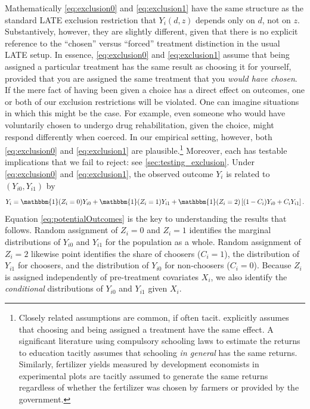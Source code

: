 \documentclass[12pt, a4paper]{article}
\begin{document}
Mathematically \eqref{eq:exclusion0} and \eqref{eq:exclusion1} have the same structure as the standard LATE exclusion restriction that $Y_i(d,z)$ depends only on $d$, not on $z$. 
Substantively, however, they are slightly different, given that there is no explicit reference to the ``chosen'' versus ``forced'' treatment distinction in the usual LATE setup.
In essence, \eqref{eq:exclusion0} and \eqref{eq:exclusion1} assume that being assigned a particular treatment has the same result as choosing it for yourself, provided that you are assigned the same treatment that you \emph{would have chosen}. 
If the mere fact of having been given a choice has a direct effect on outcomes, one or both of our exclusion restrictions will be violated.
One can imagine situations in which this might be the case.
For example, even someone who would have voluntarily chosen to undergo drug rehabilitation, given the choice, might respond differently when coerced.
In our empirical setting, however, both \eqref{eq:exclusion0} and \eqref{eq:exclusion1} are plausible.\footnote{Closely related assumptions are common, if often tacit. \cite{chamberlain2011bayesian} explicitly assumes that choosing and being assigned a treatment have the same effect. A significant literature using compulsory schooling laws to estimate the returns to education tacitly assumes that schooling \emph{in general} has the same returns. Similarly, fertilizer yields measured by development economists in experimental plots are tacitly assumed to generate the same returns regardless of whether the fertilizer was chosen by farmers or provided by the government.} 
Moreover, each has testable implications that we fail to reject: see \autoref{sec:testing_exclusion}. 
Under \eqref{eq:exclusion0} and \eqref{eq:exclusion1}, the observed outcome $Y_i$ is related to $(Y_{i0}, Y_{i1})$ by 
\begin{equation}
    Y_i = \mathbbm{1}(Z_i =0) Y_{i0} + \mathbbm{1}(Z_i = 1)  Y_{i1}  + \mathbbm{1}(Z_i = 2) \left[(1 - C_i) Y_{i0} + C_i Y_{i1} \right].
\label{eq:potentialOutcomes}
\end{equation}
Equation \ref{eq:potentialOutcomes} is the key to understanding the results that follows. 
Random assignment of $Z_i=0$ and $Z_i = 1$ identifies the marginal distributions of $Y_{i0}$ and $Y_{i1}$ for the population as a whole. 
Random assignment of $Z_i=2$ likewise point identifies the share of choosers ($C_i = 1$), the distribution of $Y_{i1}$ for choosers, and the distribution of $Y_{i0}$ for non-choosers ($C_i = 0$).
Because $Z_i$ is assigned independently of pre-treatment covariates $X_i$, we also identify the \emph{conditional} distributions of $Y_{i0}$ and $Y_{i1}$ given $X_i$. 
\end{document}
